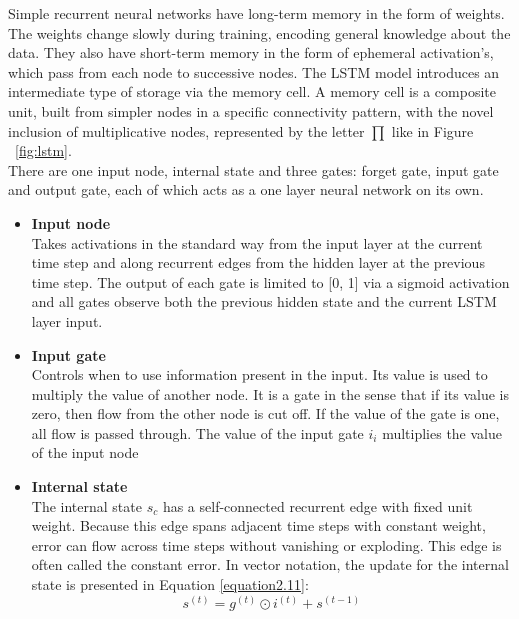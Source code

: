 Simple recurrent neural networks have long-term memory in the form of weights.
The weights change slowly during training, encoding general knowledge about
the data. They also have short-term memory in the form of ephemeral activation's, which pass from each node to successive nodes. The LSTM model
introduces an intermediate type of storage via the memory cell. A memory cell
is a composite unit, built from simpler nodes in a specific connectivity pattern,
with the novel inclusion of multiplicative nodes, represented by the
letter $\prod$ like in Figure ~\ref{fig:lstm}.\\

There are one input node, internal state and three gates: forget gate, input gate and output gate, each of which acts as a one layer neural network on its own.
\begin{itemize}
    \item \textbf{Input node}\\
    Takes activations in the standard way from the input layer at the current time step and along recurrent edges from the hidden layer at the previous time step. The output of each gate is limited to [0, 1] via a sigmoid activation and all gates observe both the previous hidden state and the current LSTM layer input.
    
\item \textbf{Input gate}\\
Controls when to use information present in the input. Its value is used to multiply the value of another node. It is a gate in the sense that if its value is zero, then flow from the other node is cut off. If the value of the gate is one, all
flow is passed through. The value of the input gate $i_{i}$ multiplies the value
of the input node

\item \textbf{Internal state}\\
The internal state $s_{c}$ has a self-connected recurrent edge
with fixed unit weight. Because this edge spans adjacent time steps with
constant weight, error can flow across time steps without vanishing or exploding. This edge is often called the constant error. In vector
notation, the update for the internal state is presented in Equation \ref{equation2.11}:
\begin{equation}\label{equation2.11}
     s^{(t)}=g^{(t)}\odot i^{(t)}+ s^{(t-1)}
\end{equation}


\end{itemize}
